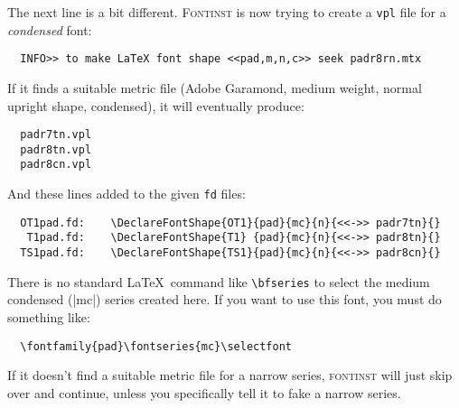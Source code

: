 \documentclass[a4paper]{ltxguide}
\newcommand*{\setfilename}[1]{\texttt{#1}}
\newcommand*{\setpackagename}[1]{\textsc{#1}}
\newcommand{\fontinst}{\setpackagename{font\-inst}\xspace}
\newcommand{\Fontinst}{\setpackagename{Font\-inst}\xspace}
\newcommand{\fd} {\setfilename{fd}\xspace}
\newcommand{\vpl}{\setfilename{vpl}\xspace}
\begin{document}
The next line is a bit different.  \Fontinst is now trying to create a
\vpl file for a \emph{condensed} font:
\begin{verbatim}
  INFO>> to make LaTeX font shape <<pad,m,n,c>> seek padr8rn.mtx
\end{verbatim}
If it finds a suitable metric file (Adobe Garamond, medium weight,
normal upright shape, condensed), it will eventually produce:
\begin{verbatim}
  padr7tn.vpl
  padr8tn.vpl
  padr8cn.vpl
\end{verbatim}
And these lines added to the given \fd files:
\begin{verbatim}
  OT1pad.fd:    \DeclareFontShape{OT1}{pad}{mc}{n}{<<->> padr7tn}{}
   T1pad.fd:    \DeclareFontShape{T1} {pad}{mc}{n}{<<->> padr8tn}{}
  TS1pad.fd:    \DeclareFontShape{TS1}{pad}{mc}{n}{<<->> padr8cn}{}
\end{verbatim}
There is no standard \LaTeX\ command like \verb|\bfseries| to select
the medium condensed (|mc|) series created here.  If you want to use
this font, you must do something like:
\begin{verbatim}
  \fontfamily{pad}\fontseries{mc}\selectfont
\end{verbatim}
If it doesn't find a suitable metric file for a narrow series,
\fontinst will just skip over and continue, unless you specifically
tell it to fake a narrow series.
\end{document}
